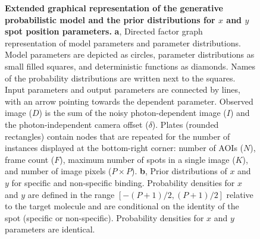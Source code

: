 \begin{figure} [t]
\caption{\textbf{Extended graphical representation of the generative probabilistic model and the prior distributions for $x$ and $y$ spot position parameters.} \textbf{a}, Directed factor graph representation \cite{Bishop2006-oa} of model parameters and parameter distributions. Model parameters are depicted as circles, parameter distributions as small filled squares, and deterministic functions as diamonds. Names of the probability distributions are written next to the squares. Input parameters and output parameters are connected by lines, with an arrow pointing towards the dependent parameter. Observed image ($D$) is the sum of the noisy photon-dependent image ($I$) and the photon-independent camera offset ($\delta$). Plates (rounded rectangles) contain nodes that are repeated for the number of instances displayed at the bottom-right corner: number of AOIs ($N$), frame count ($F$), maximum number of spots in a single image ($K$), and number of image pixels ($P \times P$). \textbf{b}, Prior distributions of $x$ and $y$ for specific and non-specific binding. Probability densities for $x$ and $y$ are defined in the range $\left[ -(P+1)/2, (P+1)/2 \right] $ relative to the target molecule and are conditional on the identity of the spot (specific or non-specific).  Probability densities for $x$ and $y$ parameters are identical. }
\end{figure}
\clearpage

